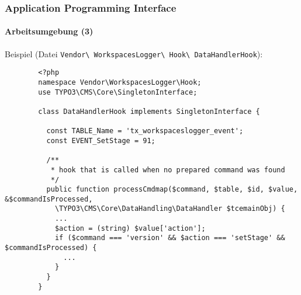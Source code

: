 
\begin{frame}[fragile]
	\frametitle{Application Programming Interface}
	\framesubtitle{Arbeitsumgebung (3)}

	Beispiel (Datei \texttt{Vendor\textbackslash
		WorkspacesLogger\textbackslash
		Hook\textbackslash
		DataHandlerHook}):

	\lstset{
		basicstyle=\tiny\ttfamily
	}

	\begin{lstlisting}
		<?php
		namespace Vendor\WorkspacesLogger\Hook;
		use TYPO3\CMS\Core\SingletonInterface;

		class DataHandlerHook implements SingletonInterface {

		  const TABLE_Name = 'tx_workspaceslogger_event';
		  const EVENT_SetStage = 91;

		  /**
		   * hook that is called when no prepared command was found
		   */
		  public function processCmdmap($command, $table, $id, $value, &$commandIsProcessed,
		    \TYPO3\CMS\Core\DataHandling\DataHandler $tcemainObj) {
		    ...
		    $action = (string) $value['action'];
		    if ($command === 'version' && $action === 'setStage' && $commandIsProcessed) {
		      ...
		    }
		  }
		}
	\end{lstlisting}

\end{frame}


